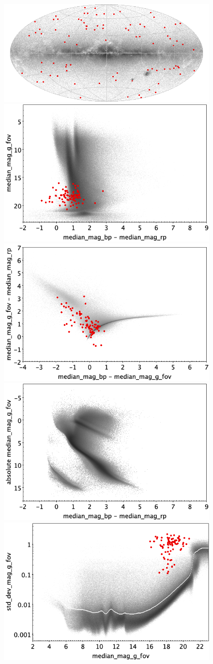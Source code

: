 \documentclass[longauth]{aa}
\begin{document}
\begin{appendix}
\begin{figure}
\centering
{} \includegraphics[width=0.6\hsize]{figures/appendix/SN_trn_sky.png} \\ %
\vspace{4mm}
 \includegraphics[width=0.45\hsize]{figures/appendix/SN_trn_cm.png}  %
\hspace{2mm}
 \includegraphics[width=0.45\hsize]{figures/appendix/SN_trn_cc.png} \\ %
\vspace{4mm}
 \includegraphics[width=0.45\hsize]{figures/appendix/SN_trn_cam.png}  %
\hspace{2mm}
 \includegraphics[width=0.45\hsize]{figures/appendix/SN_trn_msd.png} \\ %

\end{figure}
\end{appendix}
\end{document}
